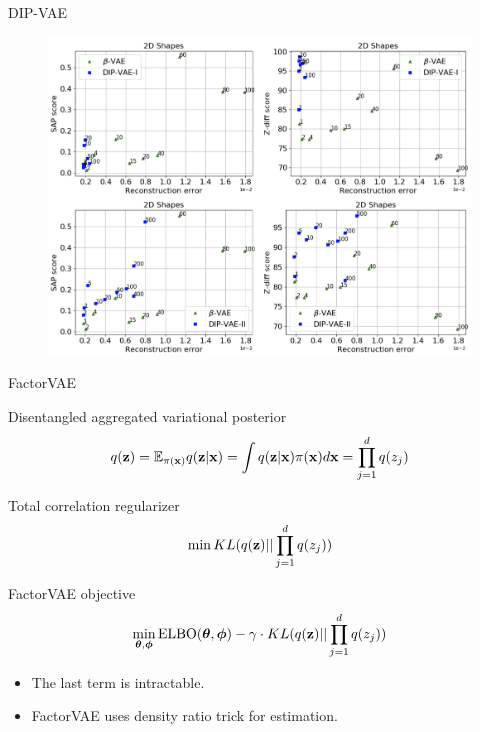 \begin{frame}{DIP-VAE}
	\begin{figure}
		\centering
		\includegraphics[width=0.95\linewidth]{figs/dip-vae_2}
	\end{figure}

\end{frame}
\begin{frame}{FactorVAE}
	\begin{block}{Disentangled aggregated variational posterior}
		\vspace{-0.3cm}
		\[
		q(\mathbf{z}) = \mathbb{E}_{\pi(\mathbf{x})} q(\mathbf{z} | \mathbf{x}) = \int q(\mathbf{z} | \mathbf{x}) \pi(\mathbf{x}) d\mathbf{x} = \prod_{j=1}^d q(z_j)
		\]
		\vspace{-0.3cm}
	\end{block}
	\begin{block}{Total correlation regularizer}
		\vspace{-0.3cm}
		\[
		\min KL(q(\mathbf{z}) || \prod_{j=1}^d q(z_j))
		\]
		\vspace{-0.3cm}
	\end{block}
	\begin{block}{FactorVAE objective}
		\vspace{-0.3cm}
		\[
		\min_{\boldsymbol{\theta}, \boldsymbol{\phi}} \text{ELBO}(\boldsymbol{\theta}, \boldsymbol{\phi}) - \gamma \cdot KL(q(\mathbf{z}) || \prod_{j=1}^d q(z_j))
		\]
		\vspace{-0.3cm}
	\end{block}
	\begin{itemize}
		\item The last term is intractable.
		\item FactorVAE uses density ratio trick for estimation. 
	\end{itemize}

\end{frame}
